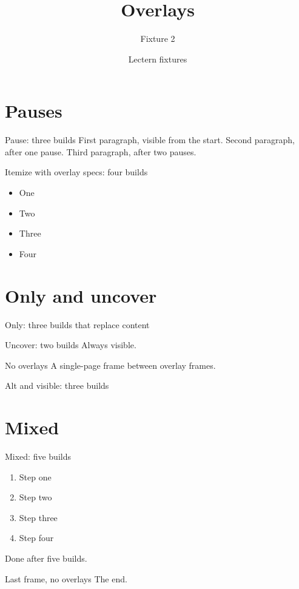 \documentclass[aspectratio=43]{beamer}
\title{Overlays}
\subtitle{Fixture 2}
\author{Lectern fixtures}
\date{}
\begin{document}
\begin{frame}
  \titlepage
\end{frame}
\section{Pauses}
\begin{frame}{Pause: three builds}
  First paragraph, visible from the start.
  \pause
  Second paragraph, after one pause.
  \pause
  Third paragraph, after two pauses.
\end{frame}
\begin{frame}{Itemize with overlay specs: four builds}
  \begin{itemize}
    \item<1-> One
    \item<2-> Two
    \item<3-> Three
    \item<4-> Four
  \end{itemize}
\end{frame}
\section{Only and uncover}
\begin{frame}{Only: three builds that replace content}
\end{frame}
\begin{frame}{Uncover: two builds}
  Always visible.
\end{frame}
\begin{frame}{No overlays}
  A single-page frame between overlay frames.
\end{frame}
\begin{frame}{Alt and visible: three builds}

\end{frame}
\section{Mixed}
\begin{frame}{Mixed: five builds}
  \begin{enumerate}
    \item<1-> Step one
    \item<2-> Step two 
    \item<3-> Step three
    \item<4-> Step four
  \end{enumerate}
  \pause\pause\pause\pause
  Done after five builds.
\end{frame}
\begin{frame}{Last frame, no overlays}
  The end.
\end{frame}
\end{document}
